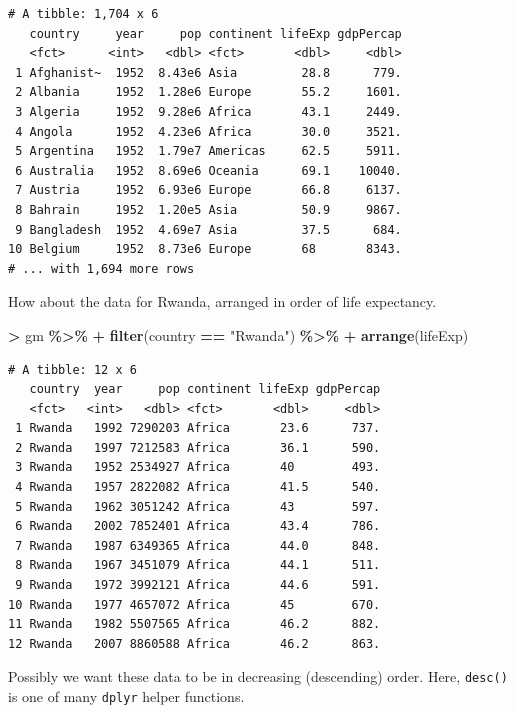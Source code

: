\documentclass[
]{krantz}
\makeatletter
\newenvironment{Shaded}{\begin{snugshade}}{\end{snugshade}}
\newcommand{\KeywordTok}[1]{\textcolor[rgb]{0.27,0.27,0.27}{\textbf{#1}}}
\newcommand{\NormalTok}[1]{#1}
\newcommand{\OperatorTok}[1]{\textcolor[rgb]{0.43,0.43,0.43}{\textbf{#1}}}
\newcommand{\StringTok}[1]{\textcolor[rgb]{0.5,0.5,0.5}{#1}}
\newenvironment{kframe}{%
\medskip{}
\setlength{\fboxsep}{.8em}
 \def\at@end@of@kframe{}%
 \ifinner\ifhmode%
  \def\at@end@of@kframe{\end{minipage}}%
  \begin{minipage}{\columnwidth}%
 \fi\fi%
 \def\FrameCommand##1{\hskip\@totalleftmargin \hskip-\fboxsep
 \colorbox{shadecolor}{##1}\hskip-\fboxsep
     \hskip-\linewidth \hskip-\@totalleftmargin \hskip\columnwidth}%
 \MakeFramed {\advance\hsize-\width
   \@totalleftmargin\z@ \linewidth\hsize
   \@setminipage}}%
 {\par\unskip\endMakeFramed%
 \at@end@of@kframe}
\renewenvironment{Shaded}{\begin{kframe}}{\end{kframe}}
\makeatother
\begin{document}
\begin{verbatim}
# A tibble: 1,704 x 6
   country     year     pop continent lifeExp gdpPercap
   <fct>      <int>   <dbl> <fct>       <dbl>     <dbl>
 1 Afghanist~  1952  8.43e6 Asia         28.8      779.
 2 Albania     1952  1.28e6 Europe       55.2     1601.
 3 Algeria     1952  9.28e6 Africa       43.1     2449.
 4 Angola      1952  4.23e6 Africa       30.0     3521.
 5 Argentina   1952  1.79e7 Americas     62.5     5911.
 6 Australia   1952  8.69e6 Oceania      69.1    10040.
 7 Austria     1952  6.93e6 Europe       66.8     6137.
 8 Bahrain     1952  1.20e5 Asia         50.9     9867.
 9 Bangladesh  1952  4.69e7 Asia         37.5      684.
10 Belgium     1952  8.73e6 Europe       68       8343.
# ... with 1,694 more rows
\end{verbatim}

How about the data for Rwanda, arranged in order of life expectancy.

\begin{Shaded}
\begin{Highlighting}[]
\OperatorTok{\textgreater{}}\StringTok{ }\NormalTok{gm }\OperatorTok{\%\textgreater{}\%}\StringTok{ }
\OperatorTok{+}\StringTok{   }\KeywordTok{filter}\NormalTok{(country }\OperatorTok{==}\StringTok{ "Rwanda"}\NormalTok{) }\OperatorTok{\%\textgreater{}\%}\StringTok{ }
\OperatorTok{+}\StringTok{   }\KeywordTok{arrange}\NormalTok{(lifeExp)}
\end{Highlighting}
\end{Shaded}

\begin{verbatim}
# A tibble: 12 x 6
   country  year     pop continent lifeExp gdpPercap
   <fct>   <int>   <dbl> <fct>       <dbl>     <dbl>
 1 Rwanda   1992 7290203 Africa       23.6      737.
 2 Rwanda   1997 7212583 Africa       36.1      590.
 3 Rwanda   1952 2534927 Africa       40        493.
 4 Rwanda   1957 2822082 Africa       41.5      540.
 5 Rwanda   1962 3051242 Africa       43        597.
 6 Rwanda   2002 7852401 Africa       43.4      786.
 7 Rwanda   1987 6349365 Africa       44.0      848.
 8 Rwanda   1967 3451079 Africa       44.1      511.
 9 Rwanda   1972 3992121 Africa       44.6      591.
10 Rwanda   1977 4657072 Africa       45        670.
11 Rwanda   1982 5507565 Africa       46.2      882.
12 Rwanda   2007 8860588 Africa       46.2      863.
\end{verbatim}

Possibly we want these data to be in decreasing (descending) order. Here, \texttt{desc()} is one of many \texttt{dplyr} helper functions.
\end{document}
